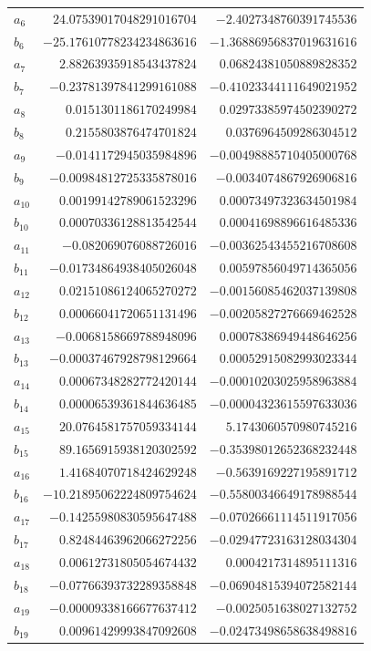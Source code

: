 \documentclass[11pt]{article}
\theoremstyle{definition}
\begin{document}
{\begin{longtable}{lrr}
$a_{6}$ & $24.07539017048291016704$ & $-2.4027348760391745536$\\
$b_{6}$ & $-25.17610778234234863616$ & $-1.36886956837019631616$\\
$a_{7}$ & $2.88263935918543437824$ & $0.06824381050889828352$\\
$b_{7}$ & $-0.23781397841299161088$ & $-0.41023344111649021952$\\
$a_{8}$ & $0.0151301186170249984$ & $0.02973385974502390272$\\
$b_{8}$ & $0.2155803876474701824$ & $0.0376964509286304512$\\
$a_{9}$ & $-0.0141172945035984896$ & $-0.00498885710405000768$\\
$b_{9}$ & $-0.00984812725335878016$ & $-0.0034074867926906816$\\
$a_{10}$ & $0.00199142789061523296$ & $0.00073497323634501984$\\
$b_{10}$ & $0.00070336128813542544$ & $0.00041698896616485336$\\
$a_{11}$ & $-0.082069076088726016$ & $-0.00362543455216708608$\\
$b_{11}$ & $-0.01734864938405026048$ & $0.00597856049714365056$\\
$a_{12}$ & $0.02151086124065270272$ & $-0.00156085462037139808$\\
$b_{12}$ & $0.00066041720651131496$ & $-0.00205827276669462528$\\
$a_{13}$ & $-0.0068158669788948096$ & $0.00078386949448646256$\\
$b_{13}$ & $-0.00037467928798129664$ & $0.00052915082993023344$\\
$a_{14}$ & $0.00067348282772420144$ & $-0.00010203025958963884$\\
$b_{14}$ & $0.00006539361844636485$ & $-0.00004323615597633036$\\
$a_{15}$ & $20.0764581757059334144$ & $5.1743060570980745216$\\
$b_{15}$ & $89.1656915938120302592$ & $-0.35398012652368232448$\\
$a_{16}$ & $1.41684070718424629248$ & $-0.5639169227195891712$\\
$b_{16}$ & $-10.21895062224809754624$ & $-0.55800346649178988544$\\
$a_{17}$ & $-0.14255980830595647488$ & $-0.07026661114511917056$\\
$b_{17}$ & $0.82484463962066272256$ & $-0.02947723163128034304$\\
$a_{18}$ & $0.00612731805054674432$ & $0.0004217314895111316$\\
$b_{18}$ & $-0.07766393732289358848$ & $-0.06904815394072582144$\\
$a_{19}$ & $-0.00009338166677637412$ & $-0.0025051638027132752$\\
$b_{19}$ & $0.00961429993847092608$ & $-0.02473498658638498816$\\
\bottomrule
\end{longtable}}
\end{document}
